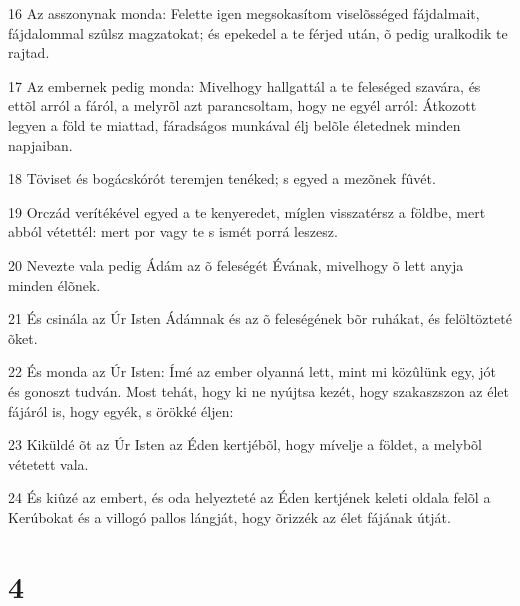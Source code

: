 \par 16 Az asszonynak monda: Felette igen megsokasítom viselõsséged fájdalmait, fájdalommal szûlsz magzatokat; és epekedel a te férjed után, õ pedig uralkodik te rajtad.
\par 17 Az embernek pedig monda: Mivelhogy hallgattál a te feleséged szavára, és ettõl arról a fáról, a melyrõl azt parancsoltam, hogy ne egyél arról: Átkozott legyen a föld te miattad, fáradságos munkával élj belõle életednek minden napjaiban.
\par 18 Töviset és bogácskórót teremjen tenéked; s egyed a mezõnek fûvét.
\par 19 Orczád verítékével egyed a te kenyeredet, míglen visszatérsz a földbe, mert abból vétettél: mert por vagy te s ismét porrá leszesz.
\par 20 Nevezte vala pedig Ádám az õ feleségét Évának, mivelhogy õ lett anyja minden élõnek.
\par 21 És csinála az Úr Isten Ádámnak és az õ feleségének bõr ruhákat, és felöltözteté õket.
\par 22 És monda az Úr Isten: Ímé az ember olyanná lett, mint mi közûlünk egy, jót és gonoszt tudván. Most tehát, hogy ki ne nyújtsa kezét, hogy szakaszszon az élet fájáról is, hogy egyék, s örökké éljen:
\par 23 Kiküldé õt az Úr Isten az Éden kertjébõl, hogy mívelje a földet, a melybõl vétetett vala.
\par 24 És kiûzé az embert, és oda helyezteté az Éden kertjének keleti oldala felõl a Kerúbokat és a villogó pallos lángját, hogy õrizzék az élet fájának útját.

\chapter{4}

